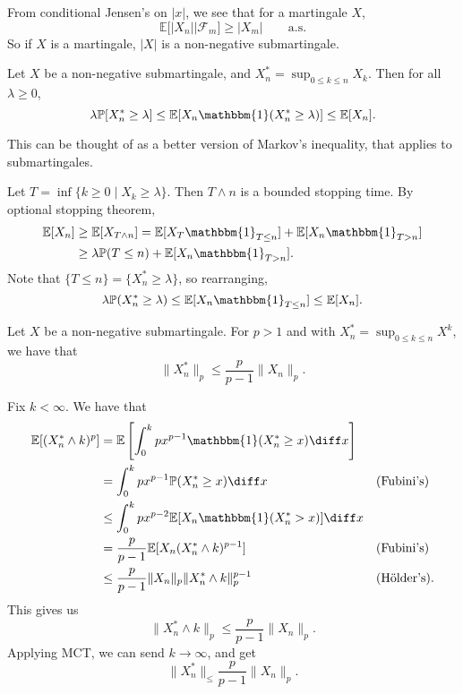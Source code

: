 \documentclass[12pt]{article}
\begin{document}

From conditional Jensen's on $|x|$, we see that for a martingale $X$,
\[
	\mathbb{E}[|X_n| | \mathcal{F}_m] \geq |X_m| \qquad \text{a.s.}
\]
So if $X$ is a martingale, $|X|$ is a non-negative submartingale.

\begin{theorem}
	Let $X$ be a non-negative submartingale, and $X_n^\ast = \sup_{0\leq k \leq n} X_k$. Then for all $\lambda \geq 0$,
	\[
		\lambda \mathbb{P}[X_n^\ast \geq \lambda] \leq \mathbb{E}[X_n \mathbbm{1}(X_n^\ast \geq \lambda)] \leq \mathbb{E}[X_n].
	\]
\end{theorem}

This can be thought of as a better version of Markov's inequality, that applies to submartingales.

\begin{proofbox}
	Let $T = \inf\{k \geq 0 \mid X_k \geq \lambda\}$. Then $T \wedge n$ is a bounded stopping time. By optional stopping theorem,
	\begin{align*}
		\mathbb{E}[X_n] &\geq \mathbb{E}[X_{T \wedge n}] = \mathbb{E}[X_T \mathbbm{1}_{T \leq n}] + \mathbb{E}[X_n \mathbbm{1}_{T > n}] \\
				&\geq \lambda \mathbb{P}(T \leq n) + \mathbb{E}[X_n \mathbbm{1}_{T > n}].
	\end{align*}
	Note that $\{T \leq n\} = \{X_n^\ast \geq \lambda\}$, so rearranging,
	\[
	\lambda \mathbb{P}(X_n^\ast \geq \lambda) \leq \mathbb{E}[X_n \mathbbm{1}_{T \leq n}] \leq \mathbb{E}[X_n].
	\]
\end{proofbox}

\begin{theorem}
	Let $X$ be a non-negative submartingale. For $p > 1$ and with $X_n^\ast = \sup_{0 \leq k \leq n} X^k$, we have that
	\[
	\|X_n^\ast\|_p \leq \frac{p}{p-1} \|X_n\|_p.
	\]
\end{theorem}

\begin{proofbox}
	Fix $k < \infty$. We have that
	\begin{align*}
		\mathbb{E}[(X_n^\ast \wedge k)^p] &= \mathbb{E}\left[ \int_0^k p x^{p-1} \mathbbm{1}(X_n^\ast \geq x) \diff x \right] & & \\
						  &= \int_0^k px^{p-1} \mathbb{P}(X_n^\ast \geq x) \diff x & &\text{(Fubini's)} \\
						  &\leq \int_0^k p x^{p-2} \mathbb{E}[X_n \mathbbm{1}(X_n^\ast > x)] \diff x & & \\
						  &= \frac{p}{p-1} \mathbb{E}[X_n(X_n^\ast \wedge k)^{p-1}] & &\text{(Fubini's)} \\
						  &\leq \frac{p}{p-1} \|X_n\|_p \|X_n^\ast \wedge k\|_p^{p-1} & &\text{(H\"older's)}.
	\end{align*}
	This gives us
	\[
	\|X_n^\ast \wedge k\|_p \leq \frac{p}{p-1} \|X_n\|_p.
	\]
	Applying MCT, we can send $k \to \infty$, and get
	\[
	\|X_n^\ast\|_ \leq \frac{p}{p-1}\|X_n\|_p.
	\]
\end{proofbox}
\end{document}
